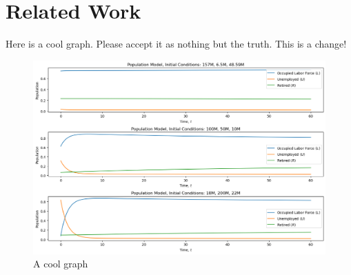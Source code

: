 \documentclass{article}
\begin{document}
\section{Related Work}

Here is a cool graph. Please accept it as nothing but the truth. This is a change!

\begin{figure}[h]
    \centering
    \includegraphics[width=\textwidth]{figures/vol4_proj_pic.png}
    \caption{A cool graph}
    \label{fig:cool_graph}
\end{figure}

\end{document}
